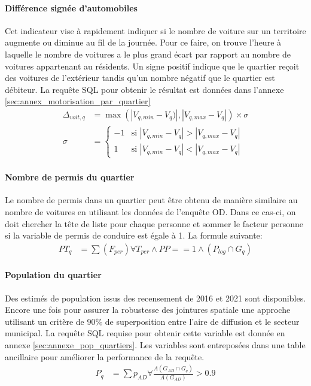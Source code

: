             \paragraph{Différence signée d'automobiles}
            Cet indicateur vise à rapidement indiquer si le nombre de voiture sur un territoire augmente ou diminue au fil de la journée. Pour ce faire, on trouve l'heure à laquelle le nombre de voitures a le plus grand écart par rapport au nombre de voitures appartenant au résidents. Un signe positif indique que le quartier reçoit des voitures de l'extérieur tandis qu'un nombre négatif que le quartier est débiteur. La requête SQL pour obtenir le résultat est données dans l'annexe \ref{sec:annex_motorisation_par_quartier}
            \begin{align}
                \Delta_{voit,q} &= \max(|V_{q,min}-V_q)|,|V_{q,max} - V_q|) \times \sigma\\
                \sigma &= 
                \begin{cases}
                    -1 & \text{si } |V_{q,min} - V_q| > |V_{q,max}- V_q| \\
                    1 & \text{si } |V_{q,min} - V_q| < |V_{q,max}- V_q|
                \end{cases}
            \end{align}
            \paragraph{Nombre de permis du quartier} Le nombre de permis dans un quartier peut être obtenu de manière similaire au nombre de voitures en utilisant les données de l'enquête OD. Dans ce cas-ci, on doit chercher la tête de liste pour chaque personne et sommer le facteur personne si la variable de permis de conduire est égale à 1. La formule suivante:
            \begin{align}
                PT_{q} &= \sum{\left(F_{per}\right)} \forall T_{per}\wedge PP==1  \wedge \left(P_{log}\cap G_q\right)
            \end{align}
            \paragraph{Population du quartier} Des estimés de population issus des recensement de 2016 et 2021 sont disponibles. Encore une fois pour assurer la robustesse des jointures spatiale une approche utilisant un critère de 90\% de superposition entre l'aire de diffusion et le secteur municipal. La requête SQL requise pour obtenir cette variable est donnée en annexe \ref{sec:annexe_pop_quartiers}. Les variables sont entreposées dans une table ancillaire pour améliorer la performance de la requête.
            \begin{align}
                P_{q}&= \sum{p_{AD}} \forall \frac{A\left(G_{AD}\cap G_q\right)}{A\left(G_{AD}\right)}>0.9
            \end{align}
